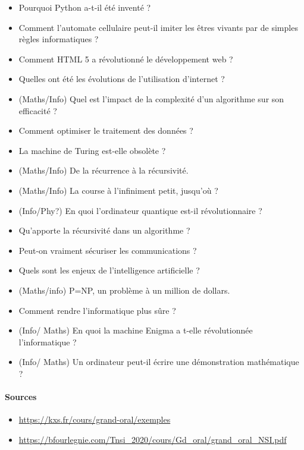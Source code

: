 \documentclass[
  letterpaper,
  DIV=11,
  numbers=noendperiod]{scrartcl}
\let\oldparagraph\paragraph
\renewcommand{\paragraph}[1]{\oldparagraph{#1}\mbox{}}
\providecommand{\tightlist}{%
  \setlength{\itemsep}{0pt}\setlength{\parskip}{0pt}}\usepackage{longtable,booktabs,array}
\begin{document}
\begin{itemize}
\item
  Pourquoi Python a-t-il été inventé ?
\item
  Comment l'automate cellulaire peut-il imiter les êtres vivants par de
  simples règles informatiques ?
\item
  Comment HTML 5 a révolutionné le développement web ?
\item
  Quelles ont été les évolutions de l'utilisation d'internet ?
\item
  (Maths/Info) Quel est l'impact de la complexité d'un algorithme sur
  son efficacité ?
\item
  Comment optimiser le traitement des données ?
\item
  La machine de Turing est-elle obsolète ?
\item
  (Maths/Info) De la récurrence à la récursivité.
\item
  (Maths/Info) La course à l'infiniment petit, jusqu'où ?
\item
  (Info/Phy?) En quoi l'ordinateur quantique est-il révolutionnaire ?
\item
  Qu'apporte la récursivité dans un algorithme ?
\item
  Peut-on vraiment sécuriser les communications ?
\item
  Quels sont les enjeux de l'intelligence artificielle ?
\item
  (Maths/info) P=NP, un problème à un million de dollars.
\item
  Comment rendre l'informatique plus sûre ?
\item
  (Info/ Maths) En quoi la machine Enigma a t-elle révolutionnée
  l'informatique ?
\item
  (Info/ Maths) Un ordinateur peut-il écrire une démonstration
  mathématique ?
\end{itemize}

\hypertarget{sources}{%
\paragraph{Sources}\label{sources}}

\begin{itemize}
\tightlist
\item
  \url{https://kxs.fr/cours/grand-oral/exemples}
\item
  \url{https://bfourlegnie.com/Tnsi_2020/cours/Gd_oral/grand_oral_NSI.pdf}
\end{itemize}
\end{document}
